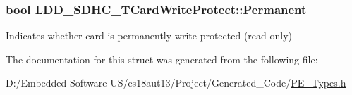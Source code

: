 \subsubsection[{Permanent}]{\setlength{\rightskip}{0pt plus 5cm}bool L\+D\+D\+\_\+\+S\+D\+H\+C\+\_\+\+T\+Card\+Write\+Protect\+::\+Permanent}\label{struct_l_d_d___s_d_h_c___t_card_write_protect_aff6b0178087c770234bd68974d643552}
Indicates whether card is permanently write protected (read-\/only) 

The documentation for this struct was generated from the following file\+:\begin{DoxyCompactItemize}
\item 
D\+:/\+Embedded Software U\+S/es18aut13/\+Project/\+Generated\+\_\+\+Code/\hyperlink{_p_e___types_8h}{P\+E\+\_\+\+Types.\+h}\end{DoxyCompactItemize}
